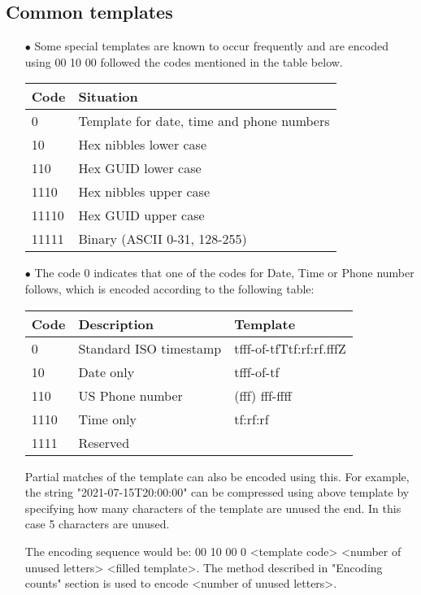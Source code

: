 \documentclass[]{article}
\begin{document}
\subsection{Common templates}
\begin{itemize}
	\item[$\bullet$] Some special templates are known to occur frequently and are encoded using 00 10 00 followed the codes mentioned in the table below.
	\item[] 
		\begin{tabular}{ | l | l |} \hline
		\textbf{Code} & \textbf{Situation} \\ \hline
		0 & Template for date, time and phone numbers \\ \hline
		10 & Hex nibbles lower case \\ \hline
		110 & Hex GUID lower case \\ \hline
		1110 & Hex nibbles upper case \\ \hline
		11110 & Hex GUID upper case \\ \hline
		11111 & Binary (ASCII 0-31, 128-255) \\ \hline
		\end{tabular}
	\item[$\bullet$] The code 0 indicates that one of the codes for Date, Time or Phone number follows, which is encoded according to the following table:
	\item[] 
		\begin{tabular}{ | l | l | l |} \hline
		\textbf{Code} & \textbf{Description} & \textbf{Template} \\ \hline
		0 & Standard ISO timestamp & tfff-of-tfTtf:rf:rf.fffZ \\ \hline
		10 & Date only & tfff-of-tf \\ \hline
		110 & US Phone number & (fff) fff-ffff \\ \hline
		1110 & Time only & tf:rf:rf \\ \hline
		1111 & Reserved \\ \hline
		\end{tabular}
	\item[]Partial matches of the template can also be encoded using this. For example, the string "2021-07-15T20:00:00" can be compressed using above template by specifying how many characters of the template are unused the end. In this case 5 characters are unused.
	\item[]The encoding sequence would be: 00 10 00 0 <template code> <number of unused letters> <filled template>. The method described in "Encoding counts" section is used to encode <number of unused letters>.

\end{itemize}
\end{document}
